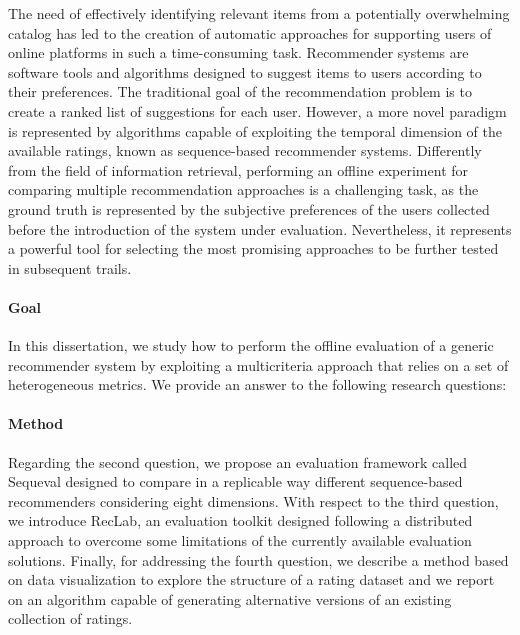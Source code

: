 The need of effectively identifying relevant items from a potentially overwhelming catalog has led to the creation of automatic approaches for supporting users of online platforms in such a time-consuming task. Recommender systems are software tools and algorithms designed to suggest items to users according to their preferences. The traditional goal of the recommendation problem is to create a ranked list of suggestions for each user. However, a more novel paradigm is represented by algorithms capable of exploiting the temporal dimension of the available ratings, known as sequence-based recommender systems. Differently from the field of information retrieval, performing an offline experiment for comparing multiple recommendation approaches is a challenging task, as the ground truth is represented by the subjective preferences of the users collected before the introduction of the system under evaluation. Nevertheless, it represents a powerful tool for selecting the most promising approaches to be further tested in subsequent trails.

\paragraph{Goal}

In this dissertation, we study how to perform the offline evaluation of a generic recommender system by exploiting a multicriteria approach that relies on a set of heterogeneous metrics. We provide an answer to the following research questions: 

\paragraph{Method}

 Regarding the second question, we propose an evaluation framework called Sequeval designed to compare in a replicable way different sequence-based recommenders considering eight dimensions. With respect to the third question, we introduce RecLab, an evaluation toolkit designed following a distributed approach to overcome some limitations of the currently available evaluation solutions. Finally, for addressing the fourth question, we describe a method based on data visualization to explore the structure of a rating dataset and we report on an algorithm capable of generating alternative versions of an existing collection of ratings.

